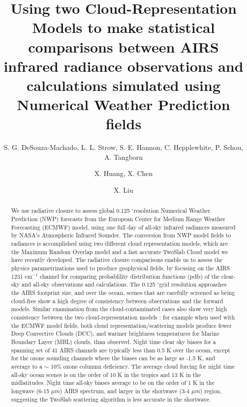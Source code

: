 \documentclass[agupp]{aguplus}              %
\newcommand{\wn}{cm$^{-1}$\xspace}
\newcommand{\um}{$\mu m$\xspace}
\newcommand{\mydeg}{\mbox{$^\circ$}}
\begin{document}
\title{Using two Cloud-Representation Models to make statistical comparisons
between AIRS infrared radiance observations and calculations simulated using
Numerical Weather Prediction fields}

\author{S. G. DeSouza-Machado, L. L. Strow, S. E. Hannon, C. Hepplewhite, \newline P. Schou, A. Tangborn}
\author{X. Huang, X. Chen} 
\author{X. Liu} 

\begin{abstract}
\small 

We use radiative closure to assess global 0.125 \mydeg resolution
Numerical Weather Prediction (NWP) forecasts from the European Center
for Medium Range Weather Forecasting (ECMWF) model, using one full day
of all-sky infrared radiances measured by NASA's Atmospheric Infrared
Sounder. The conversion from NWP model fields to radiances is
accomplished using two different cloud representation models, which
are the Maximum Random Overlap model and a fast accurate TwoSlab Cloud
model we have recently developed. The radiative closure comparisons
enable us to assess the physics parametrizations used to produce
geophysical fields, by focusing on the AIRS 1231 \wn channel for
comparing probablility distribution functions (pdfs) of the clear-sky
and all-sky observations and calculations. The 0.125 \mydeg grid
resolution approaches the AIRS footprint size, and over the ocean,
scenes that are carefully screened as being cloud-free show a high
degree of consistency between observations and the forward
models. Similar examination from the cloud-contaminated cases also
show very high consistency between the two cloud-representation models
: for example when used with the ECMWF model fields, both cloud
representation/scattering models produce fewer Deep Convective Clouds
(DCC), and warmer brightness temperatures for Marine Boundary Layer
(MBL) clouds, than observed. Night time clear sky biases for a
spanning set of 41 AIRS channels are typically less than 0.5 K over
the ocean, except for the ozone sounding channels where the biases can
be as large as -1.5 K, and average to a $\sim$ 10\% ozone columnn
deficiency. The average cloud forcing for night time all-sky ocean
scenes is on the order of 10 K in the tropics and 13 K in the
midlatitudes. Night time all-sky biases average to be on the order of
1 K in the longwave (6-15 \um) AIRS spectrum, and larger in the
shortwave (3-4 \um) region, suggesting the TwoSlab scattering
algorithm is less accurate in the shortwave.

\end{abstract}
\end{document}
